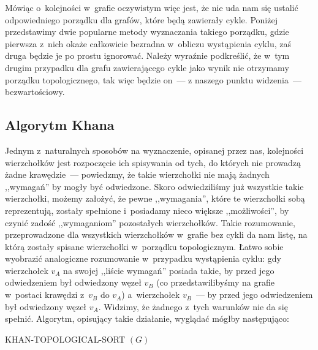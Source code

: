 Mówiąc o~kolejności w~grafie oczywistym więc jest, że nie uda nam się ustalić odpowiedniego porządku dla grafów, które będą zawierały cykle. Poniżej przedstawimy dwie popularne metody wyznaczania takiego porządku, gdzie pierwsza z~nich okaże całkowicie bezradna w~obliczu wystąpienia cyklu, zaś druga będzie je po prostu ignorować. Należy wyraźnie podkreślić, że w~tym drugim przypadku dla grafu zawierającego cykle jako wynik nie otrzymamy porządku topologicznego, tak więc będzie on~--- z naszego punktu widzenia~--- bezwartościowy.

\subsection{Algorytm Khana}

Jednym z~naturalnych sposobów na wyznaczenie, opisanej przez nas, kolejności wierzchołków jest rozpoczęcie ich spisywania od tych, do których nie prowadzą żadne krawędzie~--- powiedzmy, że takie wierzchołki nie mają żadnych ,,wymagań'' by mogły być odwiedzone. Skoro odwiedziliśmy już wszystkie takie wierzchołki, możemy założyć, że pewne ,,wymagania'', które te wierzchołki sobą reprezentują, zostały spełnione i~posiadamy nieco większe ,,możliwości'', by czynić zadość ,,wymaganiom'' pozostałych wierzchołków. Takie rozumowanie, przeprowadzone dla wszystkich wierzchołków w~grafie bez cykli da nam listę, na którą zostały spisane wierzchołki w~porządku topologicznym. Łatwo sobie wyobrazić analogiczne rozumowanie w~przypadku wystąpienia cyklu: gdy wierzchołek $v_{A}$ na swojej ,,liście wymagań'' posiada takie, by przed jego odwiedzeniem był odwiedzony węzeł $v_{B}$ (co przedstawilibyśmy na grafie w~postaci krawędzi z~$v_{B}$ do $v_{A}$) a~wierzchołek $v_{B}$~--- by przed jego odwiedzeniem był odwiedzony węzeł $v_{A}$. Widzimy, że żadnego z~tych warunków nie da się spełnić. Algorytm, opisujący takie działanie, wyglądać mógłby następująco:

\begin{algorithm}[!htbp]
\DontPrintSemicolon
{}
\caption{ KHAN-TOPOLOGICAL-SORT $\left( G \right)$\label{alg:KhanTopologicalSort}}
\end{algorithm}

